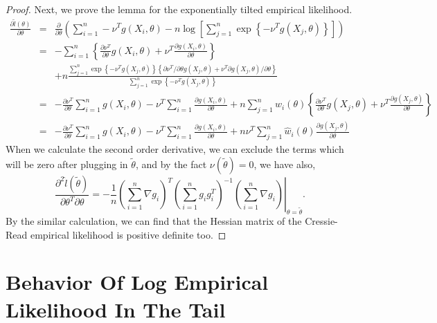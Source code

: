 \begin{proof}
	Next, we prove the lemma for the exponentially tilted empirical likelihood.
	\begin{eqnarray*}
		\frac{\partial\tilde{l}\left(\theta\right)}{\partial\theta}	&=&	\frac{\partial}{\partial\theta} \left( \sum_{i=1}^{n}-\nu^{T}g\left(X_{i},\theta\right)-n\log\left[\sum_{j=1}^{n}\exp\left\{ -\nu^{T}g\left(X_{j},\theta\right)\right\} \right] \right) \\
	&=&	-\sum_{i=1}^{n}\left\{ \frac{\partial\nu^{T}}{\partial\theta}g\left(X_{i},\theta\right)+\nu^{T}\frac{\partial g\left(X_{i},\theta\right)}{\partial\theta}\right\} \\
	&	&+n\frac{\sum_{j=1}^{n}\exp\left\{- \nu^{T}g\left(X_{j},\theta\right)\right\} \left\{ \partial\nu^{T}/\partial\theta g\left(X_{j},\theta\right)+\nu^{T}\partial g\left(X_{j},\theta\right)/\partial\theta\right\} }{\sum_{j=1}^{n}\exp\left\{ - \nu^{T}g\left(X_{j},\theta\right)\right\} }\\
	&=&	-\frac{\partial\nu^{T}}{\partial\theta}\sum_{i=1}^{n}g\left(X_{i},\theta\right)-\nu^{T}\sum_{i=1}^{n}\frac{\partial g\left(X_{i},\theta\right)}{\partial\theta}+n\sum_{j=1}^{n}\hat{w}_{i}\left(\theta\right)\left\{ \frac{\partial\nu^{T}}{\partial\theta}g\left(X_{j},\theta\right)+\nu^{T}\frac{\partial g\left(X_{j},\theta\right)}{\partial\theta}\right\}\\ 
	&=&	-\frac{\partial\nu^{T}}{\partial\theta}\sum_{i=1}^{n}g\left(X_{i},\theta\right)-\nu^{T}\sum_{i=1}^{n}\frac{\partial g\left(X_{i},\theta\right)}{\partial\theta}+n\nu^{T}\sum_{j=1}^{n}\hat{w}_{i}\left(\theta\right)\frac{\partial g\left(X_{j},\theta\right)}{\partial\theta}
	\end{eqnarray*}
	When we calculate the second order derivative, 
	we can exclude the terms which will be zero after plugging in $\tilde{\theta}$, 
	and by the fact $\nu(\tilde{\theta})=0$, we have also,
	\[
\frac{\partial^{2}\hat{l}\left(\tilde{\theta}\right)}{\partial\theta^{T}\partial\theta}=-\frac{1}{n}\left.\left(\sum_{i=1}^{n}\nabla g_{i}\right)^{T}\left(\sum_{i=1}^{n}g_{i}g_{i}^{T}\right)^{-1}\left(\sum_{i=1}^{n}\nabla g_{i}\right)\right|_{\theta=\tilde{\theta}}.
\]
	By the similar calculation, we can find that the Hessian matrix of the Cressie-Read empirical likelihood is positive definite too.
	
\end{proof}
\section{Behavior Of Log Empirical Likelihood In  The Tail}

